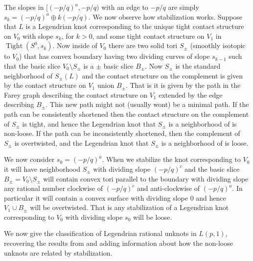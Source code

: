 \documentclass[11pt]{amsart}
\theoremstyle{plain}
\theoremstyle{definition}
\theoremstyle{remark}
\numberwithin{theorem}{section}
\DeclareMathOperator{\Tight}{Tight}
\begin{document}
The slopes in $[(-p/q)^a, -p/q)$ with an edge to $-p/q$ are simply $s_k= (-p/q)^a\oplus k(-p/q)$.
We now observe how stabilization works. Suppose that $L$ is a Legendrian knot corresponding to the unique tight contact structure on $V_0$ with slope $s_k$, for $k>0$, and some tight contact structure on $V_1$ in $\Tight(S^0,s_k)$. Now inside of $V_0$ there are two solid tori $S_\pm$ (smoothly isotopic to $V_0$) that has convex boundary having two dividing curves of slope $s_{k-1}$ such that the basic slice $V_0\setminus S_\pm$ is a $\pm$ basic slice $B_\pm$. Now $S_\pm$ is the standard neighborhood of $S_\pm(L)$ and the contact structure on the complement is given by the contact structure on $V_1$ union $B_\pm$. That is it is given by the path in the Farey graph describing the contact structure on $V_1$ extended by the edge describing $B_\pm$. This new path might not (usually wont) be a minimal path. If the path can be consistently shortened then the contact structure on the complement of $S_\pm$ is tight, and hence the Legendrian knot that $S_\pm$ is a neighborhood of is non-loose. If the path can be inconsistently shortened, then the complement of $S_\pm$ is overtwisted, and the Legendrian knot that $S_\pm$ is a neighborhood of is loose. 

We now consider $s_0=(-p/q)^a$. When we stabilize the knot corresponding to $V_0$ it will have neighborhood $S_\pm$ with dividing slope $(-p/q)^c$ and the basic slice $B_\pm=V_0\setminus S_\pm$ will contain convex tori parallel to the boundary with dividing slope any rational number clockwise of $(-p/q)^c$ and anti-clockwise of $(-p/q)^a$. In particular it will contain a convex surface with dividing slope $0$ and hence $V_1\cup B_\pm$ will be overtwisted. That is any stabilization of a Legendrian knot corresponding to $V_0$ with dividing slope $s_0$ will be loose. 

We now give the classification of Legendrian rational unknots in $L(p,1)$, recovering the results from \cite{GeigesOnaran15} and adding information about how the non-loose unknots are related by stabilization. 
\end{document}

